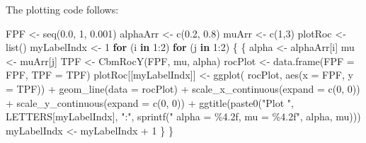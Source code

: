 \documentclass[
]{book}
\newenvironment{Shaded}{\begin{snugshade}}{\end{snugshade}}
\newcommand{\AttributeTok}[1]{\textcolor[rgb]{0.77,0.63,0.00}{#1}}
\newcommand{\ControlFlowTok}[1]{\textcolor[rgb]{0.13,0.29,0.53}{\textbf{#1}}}
\newcommand{\DecValTok}[1]{\textcolor[rgb]{0.00,0.00,0.81}{#1}}
\newcommand{\FloatTok}[1]{\textcolor[rgb]{0.00,0.00,0.81}{#1}}
\newcommand{\FunctionTok}[1]{\textcolor[rgb]{0.00,0.00,0.00}{#1}}
\newcommand{\NormalTok}[1]{#1}
\newcommand{\OtherTok}[1]{\textcolor[rgb]{0.56,0.35,0.01}{#1}}
\newcommand{\SpecialCharTok}[1]{\textcolor[rgb]{0.00,0.00,0.00}{#1}}
\newcommand{\StringTok}[1]{\textcolor[rgb]{0.31,0.60,0.02}{#1}}
\begin{document}
The plotting code follows:

\begin{Shaded}
\begin{Highlighting}[]
\NormalTok{FPF }\OtherTok{\textless{}{-}} \FunctionTok{seq}\NormalTok{(}\FloatTok{0.0}\NormalTok{, }\DecValTok{1}\NormalTok{, }\FloatTok{0.001}\NormalTok{)}
\NormalTok{alphaArr }\OtherTok{\textless{}{-}} \FunctionTok{c}\NormalTok{(}\FloatTok{0.2}\NormalTok{, }\FloatTok{0.8}\NormalTok{)}
\NormalTok{muArr }\OtherTok{\textless{}{-}} \FunctionTok{c}\NormalTok{(}\DecValTok{1}\NormalTok{,}\DecValTok{3}\NormalTok{)}
\NormalTok{plotRoc }\OtherTok{\textless{}{-}} \FunctionTok{list}\NormalTok{()}
\NormalTok{myLabelIndx }\OtherTok{\textless{}{-}} \DecValTok{1}
\ControlFlowTok{for}\NormalTok{ (i }\ControlFlowTok{in} \DecValTok{1}\SpecialCharTok{:}\DecValTok{2}\NormalTok{)}
  \ControlFlowTok{for}\NormalTok{ (j }\ControlFlowTok{in} \DecValTok{1}\SpecialCharTok{:}\DecValTok{2}\NormalTok{) }
\NormalTok{  \{}
\NormalTok{    \{}
\NormalTok{      alpha }\OtherTok{\textless{}{-}}\NormalTok{ alphaArr[i]}
\NormalTok{      mu }\OtherTok{\textless{}{-}}\NormalTok{ muArr[j]}
\NormalTok{      TPF }\OtherTok{\textless{}{-}} \FunctionTok{CbmRocY}\NormalTok{(FPF, mu, alpha)}
\NormalTok{      rocPlot }\OtherTok{\textless{}{-}} \FunctionTok{data.frame}\NormalTok{(}\AttributeTok{FPF =}\NormalTok{ FPF, }\AttributeTok{TPF =}\NormalTok{ TPF)}
\NormalTok{      plotRoc[[myLabelIndx]] }\OtherTok{\textless{}{-}} \FunctionTok{ggplot}\NormalTok{(}
\NormalTok{        rocPlot, }\FunctionTok{aes}\NormalTok{(}\AttributeTok{x =}\NormalTok{ FPF, }\AttributeTok{y =}\NormalTok{ TPF)) }\SpecialCharTok{+} 
        \FunctionTok{geom\_line}\NormalTok{(}\AttributeTok{data =}\NormalTok{ rocPlot) }\SpecialCharTok{+} 
        \FunctionTok{scale\_x\_continuous}\NormalTok{(}\AttributeTok{expand =} \FunctionTok{c}\NormalTok{(}\DecValTok{0}\NormalTok{, }\DecValTok{0}\NormalTok{)) }\SpecialCharTok{+} 
        \FunctionTok{scale\_y\_continuous}\NormalTok{(}\AttributeTok{expand =} \FunctionTok{c}\NormalTok{(}\DecValTok{0}\NormalTok{, }\DecValTok{0}\NormalTok{)) }\SpecialCharTok{+}
        \FunctionTok{ggtitle}\NormalTok{(}\FunctionTok{paste0}\NormalTok{(}\StringTok{"Plot "}\NormalTok{, }
\NormalTok{                   LETTERS[myLabelIndx], }
                   \StringTok{":"}\NormalTok{, }
                   \FunctionTok{sprintf}\NormalTok{(}\StringTok{" alpha = \%4.2f, mu = \%4.2f"}\NormalTok{, }
\NormalTok{                           alpha, mu)))}
\NormalTok{      myLabelIndx }\OtherTok{\textless{}{-}}\NormalTok{ myLabelIndx }\SpecialCharTok{+} \DecValTok{1}
\NormalTok{    \}}
\NormalTok{  \}}
\end{Highlighting}
\end{Shaded}
\end{document}
